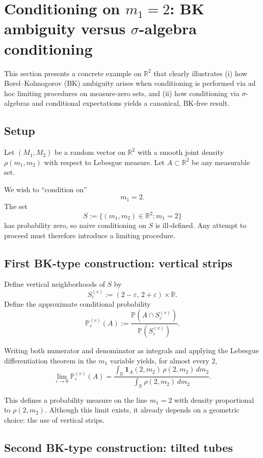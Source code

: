 \documentclass[11pt]{article}
\theoremstyle{remark}
\begin{document}
\section{Conditioning on $m_1=2$: BK ambiguity versus $\sigma$-algebra conditioning}

This section presents a concrete example on $\mathbb R^2$ that clearly illustrates
(i) how Borel--Kolmogorov (BK) ambiguity arises when conditioning is performed via
ad hoc limiting procedures on measure-zero sets, and
(ii) how conditioning via $\sigma$-algebras and conditional expectations yields a
canonical, BK-free result.

\subsection{Setup}

Let $(M_1,M_2)$ be a random vector on $\mathbb R^2$ with a smooth joint density
$\rho(m_1,m_2)$ with respect to Lebesgue measure.
Let $A\subset\mathbb R^2$ be any measurable set.

We wish to ``condition on''
\[
m_1 = 2.
\]
The set
\[
S := \{(m_1,m_2)\in\mathbb R^2 : m_1=2\}
\]
has probability zero, so naive conditioning on $S$ is ill-defined.
Any attempt to proceed must therefore introduce a limiting procedure.

\subsection{First BK-type construction: vertical strips}

Define vertical neighborhoods of $S$ by
\[
S^{(v)}_\varepsilon := (2-\varepsilon,\,2+\varepsilon)\times\mathbb R.
\]
Define the approximate conditional probability
\[
\mathbb P^{(v)}_\varepsilon(A)
:=
\frac{\mathbb P(A\cap S^{(v)}_\varepsilon)}
{\mathbb P(S^{(v)}_\varepsilon)}.
\]

Writing both numerator and denominator as integrals and applying the Lebesgue
differentiation theorem in the $m_1$ variable yields, for almost every $2$,
\[
\lim_{\varepsilon\to 0}\mathbb P^{(v)}_\varepsilon(A)
=
\frac{
\displaystyle\int_{\mathbb R}
\mathbf 1_A(2,m_2)\,\rho(2,m_2)\,dm_2
}{
\displaystyle\int_{\mathbb R}
\rho(2,m_2)\,dm_2
}.
\]

This defines a probability measure on the line $m_1=2$ with density proportional to
$\rho(2,m_2)$.
Although this limit exists, it already depends on a geometric choice: the use of
vertical strips.

\subsection{Second BK-type construction: tilted tubes}
\end{document}
